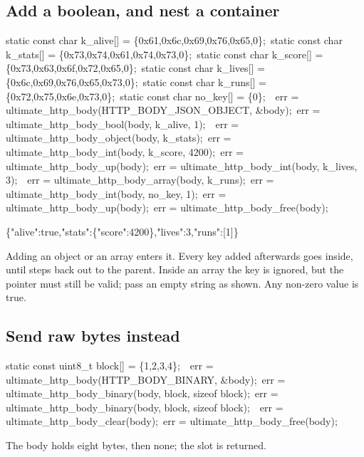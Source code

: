 \subsection*{Add a boolean, and nest a container}

\begin{listingbox}
static const char k\_alive[] = \{0x61,0x6c,0x69,0x76,0x65,0\};\
static const char k\_stats[] = \{0x73,0x74,0x61,0x74,0x73,0\};\
static const char k\_score[] = \{0x73,0x63,0x6f,0x72,0x65,0\};\
static const char k\_lives[] = \{0x6c,0x69,0x76,0x65,0x73,0\};\
static const char k\_runs[] = \{0x72,0x75,0x6e,0x73,0\};\
static const char no\_key[] = \{0\};\
\
err = ultimate\_http\_body(HTTP\_BODY\_JSON\_OBJECT, \&body);\
err = ultimate\_http\_body\_bool(body, k\_alive, 1);\
\
err = ultimate\_http\_body\_object(body, k\_stats);\
err = ultimate\_http\_body\_int(body, k\_score, 4200);\
err = ultimate\_http\_body\_up(body);\
err = ultimate\_http\_body\_int(body, k\_lives, 3);\
\
err = ultimate\_http\_body\_array(body, k\_runs);\
err = ultimate\_http\_body\_int(body, no\_key, 1);\
err = ultimate\_http\_body\_up(body);\
err = ultimate\_http\_body\_free(body);
\end{listingbox}

\begin{resultbox}
\{"alive":true,"stats":\{"score":4200\},"lives":3,"runs":[1]\}
\end{resultbox}

Adding an object or an array enters it. Every key added afterwards goes inside,
until \cmd{ultimate\_http\_body\_up()} steps back out to the parent. Inside an
array the key is ignored, but the pointer must still be valid; pass an empty
string as shown. Any non-zero value is true.

\subsection*{Send raw bytes instead}

\begin{listingbox}
static const uint8\_t block[] = \{1,2,3,4\};\
\
err = ultimate\_http\_body(HTTP\_BODY\_BINARY, \&body);\
err = ultimate\_http\_body\_binary(body, block, sizeof block);\
err = ultimate\_http\_body\_binary(body, block, sizeof block);\
\
err = ultimate\_http\_body\_clear(body);\
err = ultimate\_http\_body\_free(body);
\end{listingbox}

\begin{resultbox}
The body holds eight bytes, then none; the slot is returned.
\end{resultbox}

